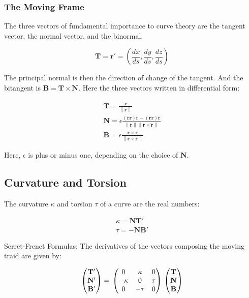 \documentclass{article}
\newcommand\norm[1]{\left\lVert#1\right\rVert}
\begin{document}
\subsubsection{The Moving Frame}

The three vectors of fundamental importance to curve theory are the tangent vector, the normal vector, and the binormal.

\begin{equation}
	\mathbf{ T } = \mathbf{ r }' = \left( \frac{ dx }{ ds }, \frac{ dy }{ ds }, \frac{ dz }{ ds } \right)
\end{equation}

The principal normal is then the direction of change of the tangent.  And the bitangent is $\mathbf{ B } = \mathbf{ T } \times \mathbf{ N }$.  Here the three vectors written in differential form:

\begin{align*}
	\mathbf{ T } = \frac{ \dot{ \mathbf{ r } } }{ \norm{ \dot{ \mathbf{ r } } } }\\
	\mathbf{ N } = \epsilon \frac{ (\dot{ \mathbf{ r } } \dot{ \mathbf{ r } }) \ddot{ \mathbf{ r } } - ( \dot{ \mathbf{ r } } \ddot{ \mathbf{ r } } ) \dot{ \mathbf{ r } } }{ \norm{ \dot{ \mathbf{ r } } } \norm{ \dot{ \mathbf{ r } } \times \ddot{ \mathbf{ r } } } }\\
	\mathbf{ B } = \epsilon \frac{ \dot{ \mathbf{ r } } \times \ddot{ \mathbf{ r } } }{ \norm{ \dot{ \mathbf{ r } } \times \ddot{ \mathbf{ r } } } }
\end{align*}

Here, $\epsilon$ is plus or minus one, depending on the choice of $\mathbf{ N }$.


\subsection{Curvature and Torsion}

The curvature $\kappa$ and torsion $\tau$ of a curve are the real numbers:

\begin{align}
	\kappa = \mathbf{ N } \mathbf{ T }'\\
	\tau = -\mathbf{ N } \mathbf{ B }'
\end{align}

Serret-Frenet Formulas:  The derivatives of the vectors composing the moving traid are given by:

\begin{equation}
	\begin{pmatrix}
		\mathbf{T}'\\
		\mathbf{N}'\\
		\mathbf{B}'
	\end{pmatrix}
	=\\
	\begin{pmatrix}
	0 & \kappa & 0\\
	-\kappa & 0 & \tau\\
	0 & -\tau & 0
	\end{pmatrix}\\
	\begin{pmatrix}
		\mathbf{T}\\
		\mathbf{N}\\
		\mathbf{B}
	\end{pmatrix}
\end{equation}
\end{document}
